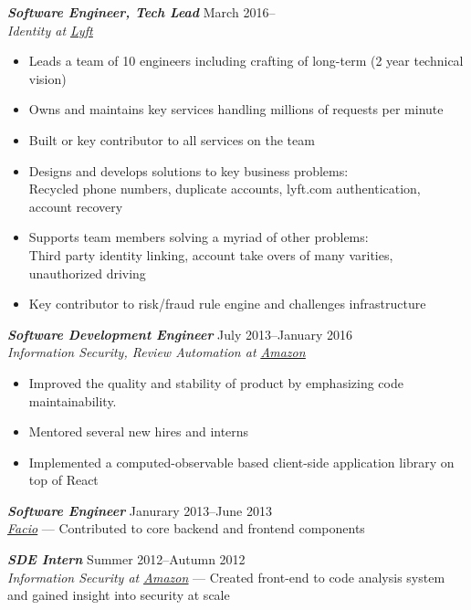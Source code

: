 \documentclass[line,letterpaper]{resume}
\begin{document}
\begin{resume}
    {\sl\textbf{Software Engineer, Tech Lead}} \hfill March 2016--\\
    \emph{Identity at \underline{\href{https://www.lyft.com/}{Lyft}}}
    \begin{itemize}
        \item Leads a team of 10 engineers including crafting of long-term (2 year technical vision)
        \item Owns and maintains key services handling millions of requests per minute
        \item Built or key contributor to all services on the team
        \item Designs and develops solutions to key business problems: \\
            Recycled phone numbers, duplicate accounts, lyft.com authentication, account recovery
        \item Supports team members solving a myriad of other problems: \\
            Third party identity linking, account take overs of many varities, unauthorized driving
        \item Key contributor to risk/fraud rule engine and challenges infrastructure
    \end{itemize}
    \vspace{-6pt}

    {\sl\textbf{Software Development Engineer}} \hfill July 2013--January
    2016\\
    \emph{Information Security, Review Automation at
    \underline{\href{http://www.amazon.com/}{Amazon}}}
    \begin{itemize}
        \item Improved the quality and stability of product by emphasizing code
            maintainability.
        \item Mentored several new hires and interns
        \item Implemented a computed-observable based client-side application
            library on top of React
    \end{itemize}
    \vspace{-6pt}

    {\sl\textbf{Software Engineer}} \hfill Janurary 2013--June 2013\\
    \emph{\underline{\href{http://www.facio.com/}{Facio}}} --- Contributed to core backend and frontend components
    \vspace{-6pt}

    {\sl\textbf{SDE Intern}} \hfill Summer 2012--Autumn 2012\\
    \emph{Information Security at
    \underline{\href{http://www.amazon.com/}{Amazon}}} --- Created front-end to code analysis system and gained insight into security at scale
    \vspace{-6pt}


\end{resume}
\end{document}
